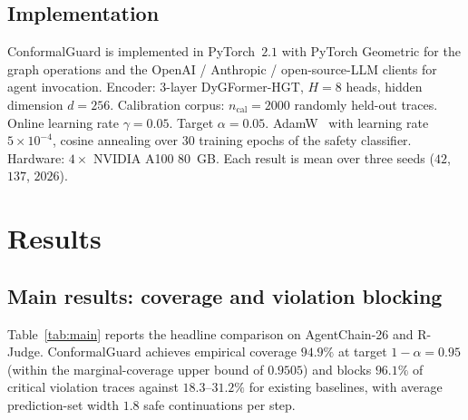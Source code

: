 \documentclass[12pt,a4paper]{article}
\theoremstyle{definition}
\theoremstyle{remark}
\newcommand{\modelname}{ConformalGuard}
\newcommand{\benchname}{AgentChain-26}
\begin{document}
\subsection{Implementation}

\modelname{} is implemented in PyTorch~$2.1$ with PyTorch Geometric for the graph operations and the OpenAI / Anthropic / open-source-LLM clients for agent invocation. Encoder: 3-layer DyGFormer-HGT, $H = 8$ heads, hidden dimension $d = 256$. Calibration corpus: $n_{\mathrm{cal}} = 2000$ randomly held-out traces. Online learning rate $\gamma = 0.05$. Target $\alpha = 0.05$. AdamW~\cite{loshchilov2019adamw} with learning rate $5 \times 10^{-4}$, cosine annealing over $30$ training epochs of the safety classifier. Hardware: $4 \times $ NVIDIA A100 80~GB. Each result is mean over three seeds ($42$, $137$, $2026$).


\section{Results}
\label{sec:results}

\subsection{Main results: coverage and violation blocking}

Table~\ref{tab:main} reports the headline comparison on \benchname{} and R-Judge. \modelname{} achieves empirical coverage $94.9\%$ at target $1-\alpha = 0.95$ (within the marginal-coverage upper bound of $0.9505$) and blocks $96.1\%$ of critical violation traces against $18.3$--$31.2\%$ for existing baselines, with average prediction-set width $1.8$ safe continuations per step.
\end{document}
